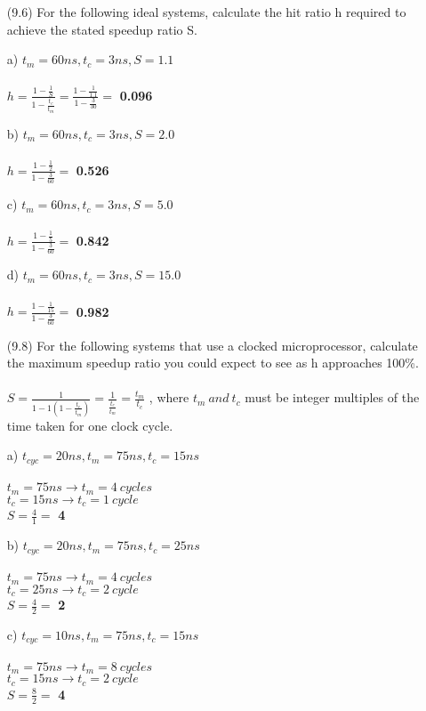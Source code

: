 \documentclass[letterpaper,10pt,titlepage]{article}
\begin{document}
\begin{enumerate}
	\item[(9.6)] For the following ideal systems, calculate the hit ratio h required to
		achieve the stated speedup ratio S.
	\item[a)] $t_{m} = 60ns, t_{c} = 3ns, S = 1.1$ \\ \\
		$h=\frac{1-\frac{1}{S}}{1-\frac{t_{c}}{t_{m}}}=\frac{1-\frac{1}{1.1}}{1-\frac{3}{30}}=$
		\textbf{0.096}
	\item[b)] $t_{m} = 60ns, t_{c} = 3ns, S = 2.0$ \\ \\
		$h=\frac{1-\frac{1}{2}}{1-\frac{3}{60}}=$ \textbf{0.526}
	\item[c)] $t_{m} = 60ns, t_{c} = 3ns, S = 5.0$ \\ \\
		$h=\frac{1-\frac{1}{5}}{1-\frac{3}{60}}=$ \textbf{0.842}
	\item[d)] $t_{m} = 60ns, t_{c} = 3ns, S = 15.0$ \\ \\
		$h=\frac{1-\frac{1}{15}}{1-\frac{3}{60}}=$ \textbf{0.982}

	\item[(9.8)] For the following systems that use a clocked microprocessor,
		calculate the maximum speedup ratio you could expect to see as h approaches
		100\%.\\ \\
		$S=\frac{1}{1-1(1-\frac{t_{c}}{t_{m}})}=\frac{1}{\frac{t_{c}}{t_{m}}}=\frac{t_{m}}{t_{c}}$
		, where $t_{m}\ and\ t_{c}$ must be integer multiples of the time taken for
		one clock cycle.
	\item[a)] $t_{cyc} = 20ns, t_{m} = 75ns, t_{c} = 15ns$ \\ \\
		$t_{m}=75ns \rightarrow t_{m}=4\ cycles$ \\
		$t_{c}=15ns \rightarrow t_{c}=1\ cycle$ \\
		$S=\frac{4}{1}=$ \textbf{4}

	\item[b)] $t_{cyc} = 20ns, t_{m} = 75ns, t_{c} = 25ns$ \\ \\
		$t_{m}=75ns \rightarrow t_{m}=4\ cycles$ \\
		$t_{c}=25ns \rightarrow t_{c}=2\ cycle$ \\
		$S=\frac{4}{2}=$ \textbf{2}

	\item[c)] $t_{cyc} = 10ns, t_{m} = 75ns, t_{c} = 15ns$ \\ \\
		$t_{m}=75ns \rightarrow t_{m}=8\ cycles$ \\
		$t_{c}=15ns \rightarrow t_{c}=2\ cycle$ \\
		$S=\frac{8}{2}=$ \textbf{4}


\end{enumerate}
\end{document}
